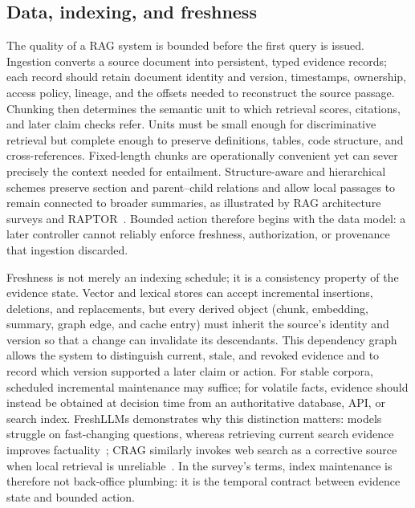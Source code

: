 \subsection{Data, indexing, and freshness}

The quality of a RAG system is bounded before the first query is issued. Ingestion converts a source document into persistent, typed evidence records; each record should retain document identity and version, timestamps, ownership, access policy, lineage, and the offsets needed to reconstruct the source passage. Chunking then determines the semantic unit to which retrieval scores, citations, and later claim checks refer. Units must be small enough for discriminative retrieval but complete enough to preserve definitions, tables, code structure, and cross-references. Fixed-length chunks are operationally convenient yet can sever precisely the context needed for entailment. Structure-aware and hierarchical schemes preserve section and parent--child relations and allow local passages to remain connected to broader summaries, as illustrated by RAG architecture surveys and RAPTOR~\cite{gao2023ragsurvey,sarthi2024raptor}. Bounded action therefore begins with the data model: a later controller cannot reliably enforce freshness, authorization, or provenance that ingestion discarded.

Freshness is not merely an indexing schedule; it is a consistency property of the evidence state. Vector and lexical stores can accept incremental insertions, deletions, and replacements, but every derived object (chunk, embedding, summary, graph edge, and cache entry) must inherit the source's identity and version so that a change can invalidate its descendants. This dependency graph allows the system to distinguish current, stale, and revoked evidence and to record which version supported a later claim or action. For stable corpora, scheduled incremental maintenance may suffice; for volatile facts, evidence should instead be obtained at decision time from an authoritative database, API, or search index. FreshLLMs demonstrates why this distinction matters: models struggle on fast-changing questions, whereas retrieving current search evidence improves factuality~\cite{vu2023freshllms}; CRAG similarly invokes web search as a corrective source when local retrieval is unreliable~\cite{yan2024crag}. In the survey's terms, index maintenance is therefore not back-office plumbing: it is the temporal contract between evidence state and bounded action.

